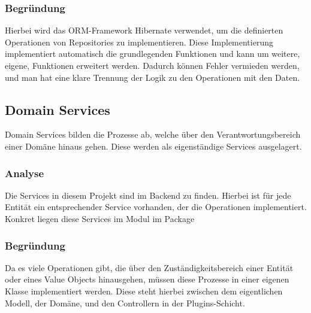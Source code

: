         \subsubsection{Begründung}
        Hierbei wird das ORM-Framework Hibernate verwendet, um die definierten Operationen von Repositories zu implementieren. Diese Implementierung implementiert automatisch die grundlegenden Funktionen und kann um weitere, eigene, Funktionen erweitert werden. Dadurch können Fehler vermieden werden, und man hat eine klare Trennung der Logik zu den Operationen mit den Daten.
        
    \subsection{Domain Services}
    Domain Services bilden die Prozesse ab, welche über den Verantwortungsbereich einer Domäne hinaus gehen. Diese werden als eigenständige Services ausgelagert.

        \subsubsection{Analyse}
        Die Services in diesem Projekt sind im Backend zu finden. Hierbei ist für jede Entität ein entsprechender Service vorhanden, der die Operationen implementiert. Konkret liegen diese Services im Modul  im Package 

        \subsubsection{Begründung}
        Da es viele Operationen gibt, die über den Zuständigkeitsbereich einer Entität oder eines Value Objects hinausgehen, müssen diese Prozesse in einer eigenen Klasse implementiert werden. Diese steht hierbei zwischen dem eigentlichen Modell, der Domäne, und den Controllern in der Plugins-Schicht.